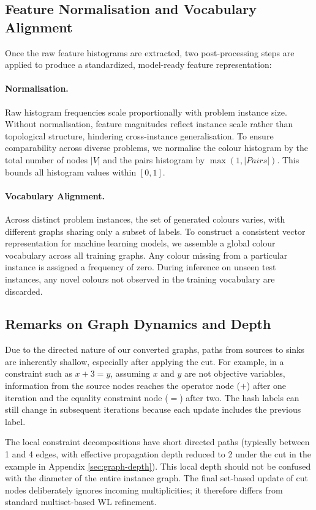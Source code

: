 \subsection{Feature Normalisation and Vocabulary Alignment}\label{sec:normalisation}
Once the raw feature histograms are extracted, two post-processing steps are applied to produce a standardized, model-ready feature representation:

\paragraph{Normalisation.} Raw histogram frequencies scale proportionally with problem instance size. Without normalisation, feature magnitudes reflect instance scale rather than topological structure, hindering cross-instance generalisation. To ensure comparability across diverse problems, we normalise the colour histogram by the total number of nodes $|V|$ and the pairs histogram by $\max(1, |Pairs|)$. This bounds all histogram values within $[0, 1]$.

\paragraph{Vocabulary Alignment.} Across distinct problem instances, the set of generated colours varies, with different graphs sharing only a subset of labels. To construct a consistent vector representation for machine learning models, we assemble a global colour vocabulary across all training graphs. Any colour missing from a particular instance is assigned a frequency of zero. During inference on unseen test instances, any novel colours not observed in the training vocabulary are discarded.

\subsection{Remarks on Graph Dynamics and Depth}\label{sec:feature_characteristics}
Due to the directed nature of our converted graphs, paths from sources to sinks are inherently shallow, especially after applying the cut. For example, in a constraint such as $x + 3 = y$, assuming $x$ and $y$ are not objective variables, information from the source nodes reaches the operator node ($+$) after one iteration and the equality constraint node ($=$) after two. The hash labels can still change in subsequent iterations because each update includes the previous label.

The local constraint decompositions have short directed paths (typically between 1 and 4 edges, with effective propagation depth reduced to 2 under the cut in the example in Appendix \ref{sec:graph-depth}). This local depth should not be confused with the diameter of the entire instance graph. The final set-based update of cut nodes deliberately ignores incoming multiplicities; it therefore differs from standard multiset-based WL refinement.
